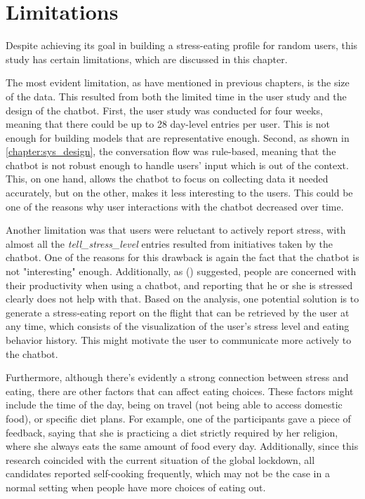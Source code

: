 
\chapter{Limitations}\label{chapter:limitations}
Despite achieving its goal in building a stress-eating profile for random users, this study has certain limitations, which are discussed in this chapter.

The most evident limitation, as have mentioned in previous chapters, is the size of the data. This resulted from both the limited time in the user study and the design of the chatbot. First, the user study was conducted for four weeks, meaning that there could be up to 28 day-level entries per user. This is not enough for building models that are representative enough. Second, as shown in \autoref{chapter:sys_design}, the conversation flow was rule-based, meaning that the chatbot is not robust enough to handle users' input which is out of the context. This, on one hand, allows the chatbot to focus on collecting data it needed accurately, but on the other, makes it less interesting to the users. This could be one of the reasons why user interactions with the chatbot decreased over time.

Another limitation was that users were reluctant to actively report stress, with almost all the \emph{tell\_stress\_level} entries resulted from initiatives taken by the chatbot. One of the reasons for this drawback is again the fact that the chatbot is not "interesting" enough. Additionally, as \citeauthor{48_why_chatbot} (\citeyear{48_why_chatbot}) suggested, people are concerned with their productivity when using a chatbot, and reporting that he or she is stressed clearly does not help with that. Based on the analysis, one potential solution is to generate a stress-eating report on the flight that can be retrieved by the user at any time, which consists of the visualization of the user's stress level and eating behavior history. This might motivate the user to communicate more actively to the chatbot.

Furthermore, although there's evidently a strong connection between stress and eating, there are other factors that can affect eating choices. These factors might include the time of the day, being on travel (not being able to access domestic food), or specific diet plans. For example, one of the participants gave a piece of feedback, saying that she is practicing a diet strictly required by her religion, where she always eats the same amount of food every day. Additionally, since this research coincided with the current situation of the global lockdown, all candidates reported self-cooking frequently, which may not be the case in a normal setting when people have more choices of eating out.
